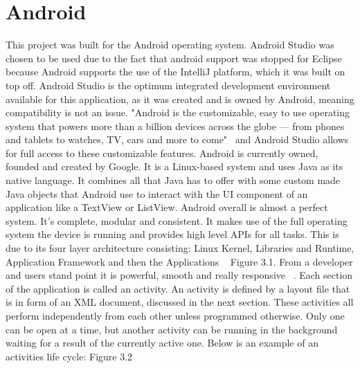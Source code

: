 \section{Android}
This project was built for the Android operating system. Android Studio was chosen to be used due to the fact that android support was stopped for Eclipse because Android supports the use of the IntelliJ platform, which it was built on top off. Android Studio is the optimum integrated development environment available for this application, as it was created and is owned by Android, meaning compatibility is not an issue. "Android is the customizable, easy to use operating system that powers more than a billion devices across the globe — from phones and tablets to watches, TV, cars and more to come"~\cite{android} and Android Studio allows for full access to these customizable features. Android is currently owned, founded and created by Google. It is a Linux-based system and uses Java as its native language. It combines all that Java has to offer with some custom made Java objects that Android use to interact with the UI component of an application like a TextView or ListView. Android overall is almost a perfect system. It's complete, modular and consistent. It makes use of the full operating system the device is running and provides high level APIs for all tasks. This is due to its four layer architecture consisting: Linux Kernel, Libraries and Runtime, Application Framework and then the Applications ~\cite{androidarch} Figure 3.1. From a developer and users stand point it is powerful, smooth and really responsive ~\cite{androidsystem}. Each section of the application is called an activity. An activity is defined by a layout file that is in form of an XML document, discussed in the next section. These activities all perform independently from each other unless programmed otherwise. Only one can be open at a time, but another activity can be running in the background waiting for a result of the currently active one. Below is an example of an activities life cycle: Figure 3.2

